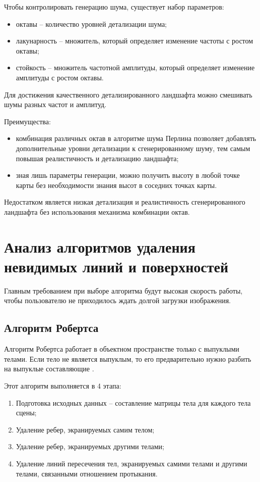 Чтобы контролировать генерацию шума, существует набор параметров:

\begin{itemize}[label=--]
	\item октавы -- количество уровней детализации шума;
	\item лакунарность -- множитель, который определяет изменение частоты с ростом октавы;
	\item стойкость -- множитель частотной амплитуды, который
	определяет изменение амплитуды с ростом октавы.
\end{itemize}

Для достижения качественного детализированного ландшафта можно смешивать шумы разных частот и амплитуд.

Преимущества:

\begin{itemize}[label=--]
	\item комбинация различных октав в алгоритме шума Перлина позволяет
	добавлять дополнительные уровни детализации к сгенерированному
	шуму, тем самым повышая реалистичность и детализацию 
	ландшафта;
	\item зная лишь параметры генерации, можно получить высоту в любой
	точке карты без необходимости знания высот в соседних точках
	карты.
\end{itemize}

Недостатком является низкая детализация и реалистичность сгенерированного ландшафта без использования механизма комбинации октав.


\section{Анализ алгоритмов удаления невидимых линий и поверхностей}
 
Главным требованием при выборе алгоритма будут высокая скорость
работы, чтобы пользователю не приходилось ждать долгой загрузки
изображения.

\subsection{Алгоритм Робертса}

Алгоритм Робертса работает в объектном пространстве только с
выпуклыми телами. Если тело не является выпуклым, то его предварительно
нужно разбить на выпуклые составляющие \cite{info_rodjers}.

Этот алгоритм выполняется в 4 этапа:

\begin{enumerate}[label={\arabic*)}]
	\item Подготовка исходных данных – составление матрицы тела для
	каждого тела сцены;
	\item Удаление ребер, экранируемых самим телом;
	\item Удаление ребер, экранируемых другими телами;
	\item Удаление линий пересечения тел, экранируемых самими телами и
	другими телами, связанными отношением протыкания.
\end{enumerate}

